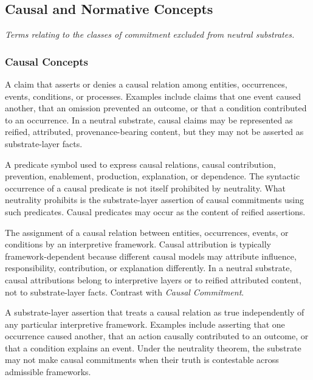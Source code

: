\subsection*{Causal and Normative Concepts}
\textit{Terms relating to the classes of commitment excluded from neutral substrates.}

\subsubsection*{Causal Concepts}

\begin{description}[style=nextline,leftmargin=1.5cm]

\item[Causal Claim]
A claim that asserts or denies a causal relation
among entities, occurrences, events, conditions, or processes.
Examples include claims that one event caused another,
that an omission prevented an outcome,
or that a condition contributed to an occurrence.
In a neutral substrate, causal claims may be represented
as reified, attributed, provenance-bearing content,
but they may not be asserted as substrate-layer facts.

\item[Causal Predicate]
A predicate symbol used to express causal relations,
causal contribution, prevention, enablement, production,
explanation, or dependence.
The syntactic occurrence of a causal predicate
is not itself prohibited by neutrality.
What neutrality prohibits is the substrate-layer assertion
of causal commitments using such predicates.
Causal predicates may occur as the content
of reified assertions.

\item[Causal Attribution]
The assignment of a causal relation between entities,
occurrences, events, or conditions by an interpretive framework.
Causal attribution is typically framework-dependent
because different causal models may attribute influence,
responsibility, contribution, or explanation differently.
In a neutral substrate, causal attributions belong
to interpretive layers or to reified attributed content,
not to substrate-layer facts.
Contrast with \emph{Causal Commitment}.

\item[Causal Commitment]
A substrate-layer assertion that treats a causal relation
as true independently of any particular interpretive framework.
Examples include asserting that one occurrence caused another,
that an action causally contributed to an outcome,
or that a condition explains an event.
Under the neutrality theorem, the substrate may not make causal
commitments when their truth is contestable across admissible frameworks.


\end{description}
